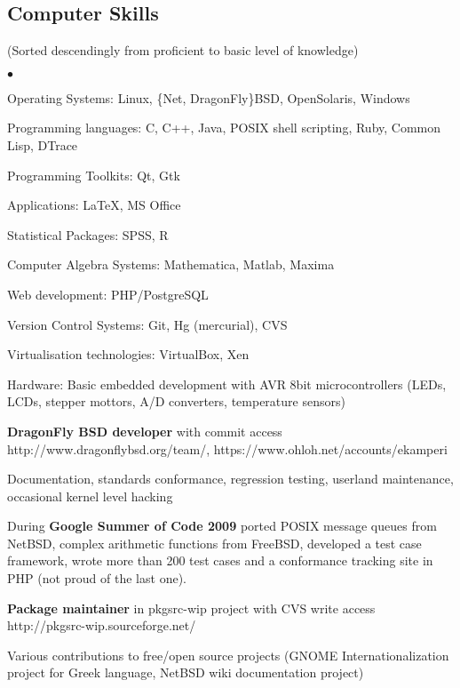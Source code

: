 \documentclass[margin,line]{res}
\newenvironment{list2}{
  \begin{list}{$\bullet$}{%
      \setlength{\itemsep}{0in}
      \setlength{\parsep}{0in} \setlength{\parskip}{0in}
      \setlength{\topsep}{0in} \setlength{\partopsep}{0in}
      \setlength{\leftmargin}{0.2in}}}{\end{list}}
\newenvironment{list3}{
  \begin{list}{
      \setlength{\leftmargin}{0.25in}}}{\end{list}}
\begin{document}
\begin{resume}
\section{\sc Computer Skills}
\small (Sorted descendingly from proficient to basic level of knowledge)
\normalsize
\begin{list2}
\item Operating Systems: Linux, \{Net, DragonFly\}BSD, OpenSolaris, Windows
\item Programming languages: C, C++, Java, POSIX shell scripting, Ruby, Common Lisp, DTrace
\item Programming Toolkits: Qt, Gtk
\item Applications: \LaTeX, MS Office
\item Statistical Packages: SPSS, R
\item Computer Algebra Systems: Mathematica, Matlab, Maxima
\item Web development: PHP/PostgreSQL
\item Version Control Systems: Git, Hg (mercurial), CVS
\item Virtualisation technologies: VirtualBox, Xen
\item Hardware: Basic embedded development with AVR 8bit microcontrollers (LEDs, LCDs,
stepper mottors, A/D converters, temperature sensors)
\item {\bf DragonFly BSD developer} with commit access\\\small http://www.dragonflybsd.org/team/,
https://www.ohloh.net/accounts/ekamperi\normalsize
\begin{list3}
\item Documentation, standards conformance, regression testing, userland
maintenance, occasional kernel level hacking
\item During {\bf Google Summer of Code 2009} ported POSIX message queues from
NetBSD, complex arithmetic functions from FreeBSD, developed a test case
framework, wrote more than 200 test cases and a conformance tracking site in PHP
(not proud of the last one).
\end{list3}
\item {\bf Package maintainer} in pkgsrc-wip project with CVS write access \\http://pkgsrc-wip.sourceforge.net/
\item Various contributions to free/open source projects (GNOME Internationalization project for Greek language,
NetBSD wiki documentation project)
\end{list2}


\end{resume}
\end{document}
